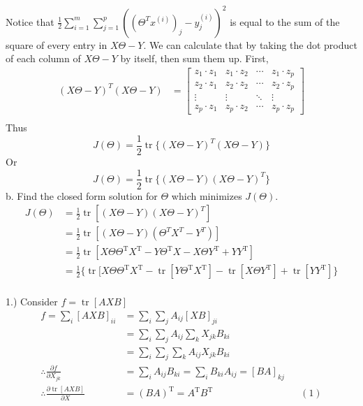 \documentclass{article}
\begin{document}
Notice that \(\frac{1}{2} \sum_{i=1}^{m} \sum_{j=1}^{p} ((\Theta^T x^{(i)})_j - y_j^{(i)})^2\) is equal 
to the sum of the square of every entry in \(X\Theta - Y\). We can calculate that by
taking the dot product of each column of \(X\Theta -Y\) by itself, then sum them up. 
First, 
\begin{align*}
    (X\Theta - Y)^T (X\Theta -Y) & = \begin{bmatrix}
        z_{1} \cdot z_{1} & z_{1} \cdot z_{2} & \cdots & z_{1} \cdot z_{p} \\
        z_{2} \cdot z_{1} & z_{2} \cdot z_{2} & \cdots & z_{2} \cdot z_{p} \\
        \vdots & \vdots & \ddots & \vdots \\
        z_{p} \cdot z_{1} & z_{p} \cdot z_{2} & \cdots & z_{p} \cdot z_{p}
    \end{bmatrix} \\
\end{align*}  
Thus
\[
    J(\Theta) = \frac{1}{2} \operatorname{tr}\{(X\Theta - Y)^T (X\Theta -Y)\}
\] 
Or 
\[
    J(\Theta) = \frac{1}{2} \operatorname{tr}\{(X\Theta - Y) (X\Theta -Y) ^ T\}
\]
\clearpage
b. Find the closed form solution for \(\Theta\) which minimizes \(J(\Theta)\).
\begin{align*}
    J(\Theta) & 
    = \frac{1}{2} \operatorname{tr} [(X\Theta - Y) (X\Theta - Y) ^ T] \\
    & = \frac{1}{2} \operatorname{tr}[(X\Theta - Y) (\Theta ^ T X^T - Y^T) ]\\
    & = \frac{1}{2 } \operatorname{tr}[X\Theta \Theta^{\mathrm{T}}X^{\mathrm{T}} - Y \Theta^{\mathrm{T}} X - X\Theta Y^{\mathrm{T}} + Y Y ^{\mathrm{T}}]\\
    & = \frac{1}{2} \{\operatorname{tr}[X\Theta\Theta^{\mathrm{T}}X^{\mathrm{T}} - \operatorname{tr}[Y\Theta^{\mathrm{T}}X^{\mathrm{T}}] - \operatorname{tr}[X\Theta Y^{\mathrm{T}}] + \operatorname{tr}[YY^{\mathrm{T}}]\}\\
\end{align*}

1.) Consider \(f = \operatorname{tr}[AXB]\) 
\begin{align*}
    f  = \sum_i [AXB]_{ii} 
    & = \sum_i \sum_j A_{ij} [XB]_{ji} \\
    & = \sum_i \sum_j A_{ij} \sum_k X_{jk} B_{ki}\\
    & = \sum_i \sum_j  \sum_k A_{ij} X_{jk} B_{ki}\\
    \therefore \frac{\partial f}{\partial X_{jk}} & = \sum_i A_{ij}B_{ki} =  \sum_i B_{ki} A_{ij} = [BA]_{kj}\\
    \therefore \frac{\partial \operatorname{tr}[AXB]}{\partial X} &= (BA) ^{\mathrm{T}} = A^{\mathrm{T}}B^{\mathrm{T}} && (1)\\
\end{align*}
\end{document}
